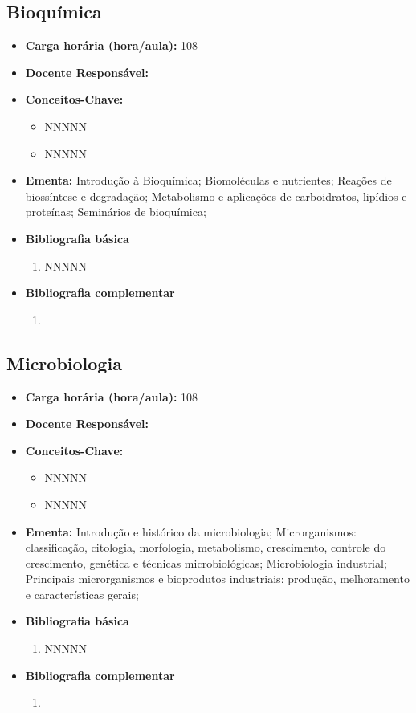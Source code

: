 \documentclass[11pt,fleqn]{book} %
\begin{document}
\subsection{Bioquímica}\label{disc:bioquimica}
\begin{itemize}
	\item \textbf{Carga horária (hora/aula):} 108
	\item \textbf{Docente Responsável:}
	\item \textbf{Conceitos-Chave:}
	\begin{itemize}
		\item NNNNN
		\item NNNNN
	\end{itemize}
	\item \textbf{Ementa:} 
	Introdução à Bioquímica; 
	Biomoléculas e nutrientes;
	Reações de biossíntese e degradação;
	Metabolismo e aplicações de carboidratos, lipídios e proteínas;
	Seminários de bioquímica;
	\item \textbf{Bibliografia básica}
	\begin{enumerate}
		\item NNNNN
	\end{enumerate}
	\item \textbf{Bibliografia complementar}
	\begin{enumerate}
		\item 
	\end{enumerate}	
\end{itemize}

\newpage
\subsection{Microbiologia}\label{disc:microbiologia}
\begin{itemize}
	\item \textbf{Carga horária (hora/aula):} 108
	\item \textbf{Docente Responsável:}
	\item \textbf{Conceitos-Chave:}
	\begin{itemize}
		\item NNNNN
		\item NNNNN
	\end{itemize}
	\item \textbf{Ementa:}
    Introdução e histórico da microbiologia; 
	Microrganismos: classificação, citologia, morfologia, metabolismo, crescimento, controle do crescimento, genética e técnicas microbiológicas;
	Microbiologia industrial; 
	Principais microrganismos e bioprodutos industriais: produção, melhoramento e características gerais;
	
	\item \textbf{Bibliografia básica}
	\begin{enumerate}
		\item NNNNN
	\end{enumerate}
	\item \textbf{Bibliografia complementar}
	\begin{enumerate}
		\item 
	\end{enumerate}	
\end{itemize}
\end{document}
